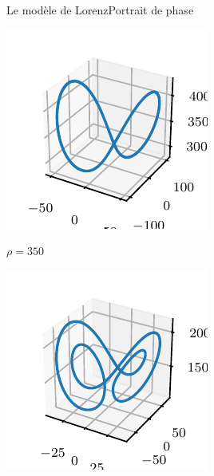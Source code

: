 \documentclass[usenames,dvipsnames,svgnames,10pt,aspectratio=169]{beamer}
\begin{document}
\begin{frame}[t, c]{Le modèle de Lorenz}{Portrait de phase}
	\begin{minipage}{.225\textwidth}
		\centering
		\includegraphics[width=.95\textwidth]{lorenz_phase_plot_0}

		$\rho = 350$
	\end{minipage}%
	\hfill
	\begin{minipage}{.225\textwidth}
		\centering
		\includegraphics[width=.95\textwidth]{lorenz_phase_plot_1}


\end{minipage}
\end{frame}
\end{document}
